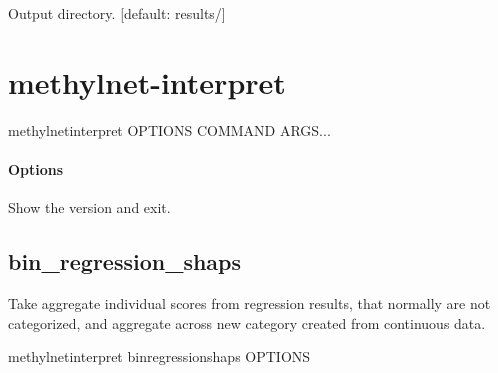 \documentclass[letterpaper,10pt,english]{sphinxmanual}
\begin{document}
\begin{fulllineitems}
\label{\detokenize{index:cmdoption-methylnet-predict-regression-report-o}}
Output directory.  {[}default: results/{]}

\end{fulllineitems}



\chapter{methylnet-interpret}
\label{\detokenize{index:methylnet-interpret}}
\begin{sphinxVerbatim}[commandchars=\\\{\}]
methylnet\PYGZhy{}interpret \PYG{o}{[}OPTIONS\PYG{o}{]} COMMAND \PYG{o}{[}ARGS\PYG{o}{]}...
\end{sphinxVerbatim}
\subsubsection*{Options}

\begin{fulllineitems}
\label{\detokenize{index:cmdoption-methylnet-interpret-version}}
Show the version and exit.

\end{fulllineitems}



\section{bin\_regression\_shaps}
\label{\detokenize{index:methylnet-interpret-bin-regression-shaps}}
Take aggregate individual scores from regression results, that normally are not categorized, and aggregate across new category created from continuous data.

\begin{sphinxVerbatim}[commandchars=\\\{\}]
methylnet\PYGZhy{}interpret bin\PYGZus{}regression\PYGZus{}shaps \PYG{o}{[}OPTIONS\PYG{o}{]}
\end{sphinxVerbatim}
\end{document}
